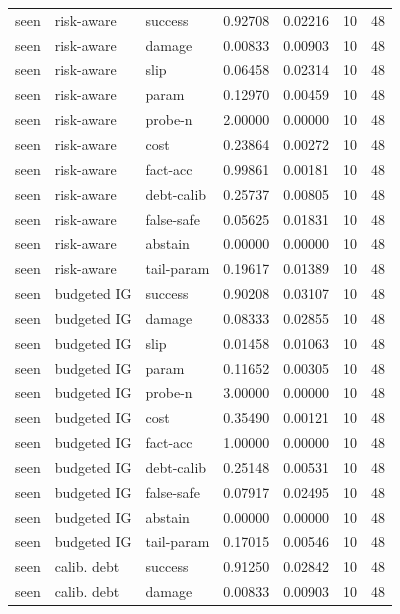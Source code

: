\documentclass{article}
\begin{document}
\begin{center}
\begin{longtable}{lllllll}
seen & risk-aware & success & 0.92708 & 0.02216 & 10 & 48 \\
seen & risk-aware & damage & 0.00833 & 0.00903 & 10 & 48 \\
seen & risk-aware & slip & 0.06458 & 0.02314 & 10 & 48 \\
seen & risk-aware & param & 0.12970 & 0.00459 & 10 & 48 \\
seen & risk-aware & probe-n & 2.00000 & 0.00000 & 10 & 48 \\
seen & risk-aware & cost & 0.23864 & 0.00272 & 10 & 48 \\
seen & risk-aware & fact-acc & 0.99861 & 0.00181 & 10 & 48 \\
seen & risk-aware & debt-calib & 0.25737 & 0.00805 & 10 & 48 \\
seen & risk-aware & false-safe & 0.05625 & 0.01831 & 10 & 48 \\
seen & risk-aware & abstain & 0.00000 & 0.00000 & 10 & 48 \\
seen & risk-aware & tail-param & 0.19617 & 0.01389 & 10 & 48 \\
seen & budgeted IG & success & 0.90208 & 0.03107 & 10 & 48 \\
seen & budgeted IG & damage & 0.08333 & 0.02855 & 10 & 48 \\
seen & budgeted IG & slip & 0.01458 & 0.01063 & 10 & 48 \\
seen & budgeted IG & param & 0.11652 & 0.00305 & 10 & 48 \\
seen & budgeted IG & probe-n & 3.00000 & 0.00000 & 10 & 48 \\
seen & budgeted IG & cost & 0.35490 & 0.00121 & 10 & 48 \\
seen & budgeted IG & fact-acc & 1.00000 & 0.00000 & 10 & 48 \\
seen & budgeted IG & debt-calib & 0.25148 & 0.00531 & 10 & 48 \\
seen & budgeted IG & false-safe & 0.07917 & 0.02495 & 10 & 48 \\
seen & budgeted IG & abstain & 0.00000 & 0.00000 & 10 & 48 \\
seen & budgeted IG & tail-param & 0.17015 & 0.00546 & 10 & 48 \\
seen & calib. debt & success & 0.91250 & 0.02842 & 10 & 48 \\
seen & calib. debt & damage & 0.00833 & 0.00903 & 10 & 48 \\
\bottomrule
\end{longtable}
\renewcommand{\arraystretch}{1.0}
\end{center}
\end{document}
